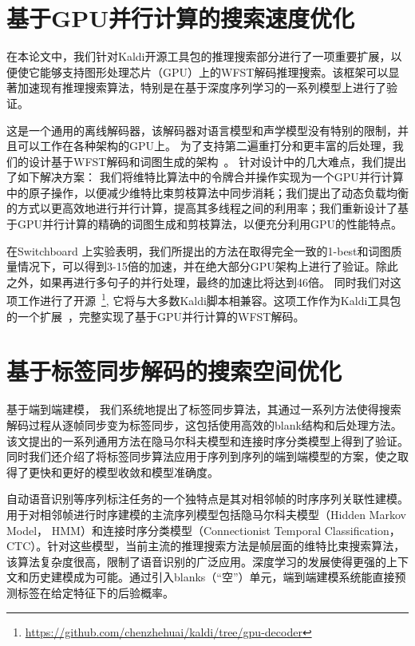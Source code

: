 \section{基于GPU并行计算的搜索速度优化}
\label{chap:sum-gpu}

在本论文中，我们针对Kaldi开源工具包的推理搜索部分进行了一项重要扩展，以便使它能够支持图形处理芯片（GPU）上的WFST解码推理搜索。该框架可以显著加速现有推理搜索算法，特别是在基于深度序列学习的一系列模型上进行了验证。

这是一个通用的离线解码器，该解码器对语言模型和声学模型没有特别的限制，并且可以工作在各种架构的GPU上。
为了支持第二遍重打分和更丰富的后处理，我们的设计基于WFST解码和词图生成的架构~\cite{povey2012generating}。
针对设计中的几大难点，我们提出了如下解决方案：
我们将维特比算法中的令牌合并操作实现为一个GPU并行计算中的原子操作，以便减少维特比束剪枝算法中同步消耗；我们提出了动态负载均衡的方式以更高效地进行并行计算，提高其多线程之间的利用率；我们重新设计了基于GPU并行计算的精确的词图生成和剪枝算法，以便充分利用GPU的性能特点。


在Switchboard 上实验表明，我们所提出的方法在取得完全一致的1-best和词图质量情况下，可以得到3-15倍的加速，并在绝大部分GPU架构上进行了验证。除此之外，如果再进行多句子的并行处理，最终的加速比将达到46倍。
同时我们对这项工作进行了开源~\footnote{\url{https://github.com/chenzhehuai/kaldi/tree/gpu-decoder}},
它将与大多数Kaldi脚本相兼容。这项工作作为Kaldi工具包的一个扩展~\cite{povey2011kaldi}，完整实现了基于GPU并行计算的WFST解码。



\section{基于标签同步解码的搜索空间优化}
\label{chap:sum-lsd}

基于端到端建模，
我们系统地提出了标签同步算法，其通过一系列方法使得搜索解码过程从逐帧同步变为标签同步，这包括使用高效的blank结构和后处理方法。该文提出的一系列通用方法在隐马尔科夫模型和连接时序分类模型上得到了验证。同时我们还介绍了将标签同步算法应用于序列到序列的端到端模型的方案，使之取得了更快和更好的模型收敛和模型准确度。


自动语音识别等序列标注任务的一个独特点是其对相邻帧的时序序列关联性建模。用于对相邻帧进行时序建模的主流序列模型包括隐马尔科夫模型（Hidden Markov Model， HMM）和连接时序分类模型（Connectionist Temporal Classification， CTC）。针对这些模型，当前主流的推理搜索方法是帧层面的维特比束搜索算法，该算法复杂度很高，限制了语音识别的广泛应用。深度学习的发展使得更强的上下文和历史建模成为可能。通过引入blanks（“空”）单元，端到端建模系统能直接预测标签在给定特征下的后验概率。

